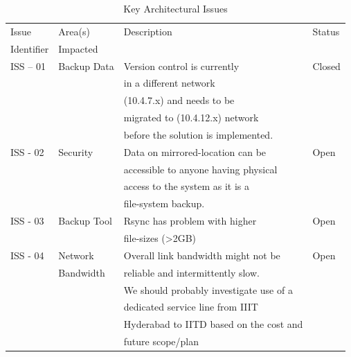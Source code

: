 \documentclass[11pt]{article}
\begin{document}
\begin{table}[H]
\caption{\label{tbl:Architectural Issues}Key Architectural Issues}
\begin{center}
\begin{tabular}{llll}
\hline
 Issue       &  Area(s)      &  Description                              &  Status  \\
 Identifier  &  Impacted     &                                           &          \\
\hline
 ISS – 01    &  Backup Data  &  Version control is currently             &  Closed  \\
             &               &  in a different network                   &          \\
             &               &  (10.4.7.x) and needs to be               &          \\
             &               &  migrated to (10.4.12.x) network          &          \\
             &               &  before the solution is implemented.      &          \\
 ISS - 02    &  Security     &  Data on mirrored-location can be         &  Open    \\
             &               &  accessible to anyone having physical     &          \\
             &               &  access to the system as it is a          &          \\
             &               &  file-system backup.                      &          \\
 ISS - 03    &  Backup Tool  &  Rsync has problem with higher            &  Open    \\
             &               &  file-sizes (>2GB)                        &          \\
 ISS - 04    &  Network      &  Overall link bandwidth might not be      &  Open    \\
             &  Bandwidth    &  reliable and intermittently slow.        &          \\
             &               &  We should probably investigate use of a  &          \\
             &               &  dedicated service line from IIIT         &          \\
             &               &  Hyderabad to IITD based on the cost and  &          \\
             &               &  future scope/plan                        &          \\
\hline
\end{tabular}
\end{center}
\end{table}
\end{document}
